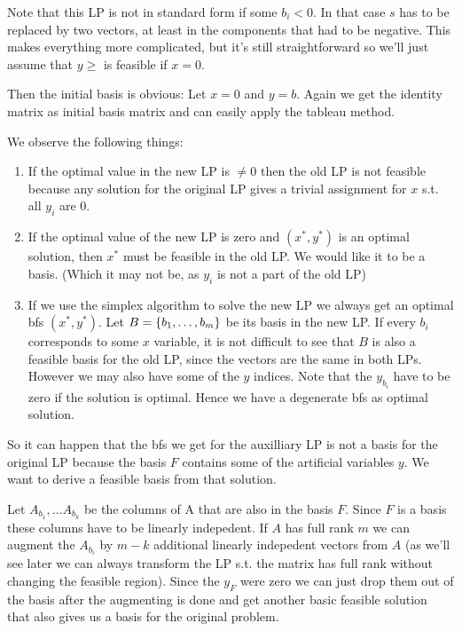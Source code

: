 Note that this LP is not in standard form if some $b_i<0$. In that case $s$ has to be replaced by two vectors, at least in the components that had to be negative. This makes everything more complicated, but it's still straightforward so we'll just assume that $y\geq$ is feasible if $x=0$.

Then the initial basis is obvious: Let $x=0$ and $y=b$. Again we get the identity matrix as initial basis matrix and can easily apply the tableau method.

We observe the following things:

\begin{enumerate}
\item If the optimal value in the new LP is $\neq 0$ then the old LP is not feasible because any solution for the original LP gives a trivial assignment for $x$ s.t. all $y_i$ are 0.
\item If the optimal value of the new LP is zero and $(x^*, y^*)$ is an optimal solution, then $x^*$ must be feasible in the old LP. We would like it to be a basis. (Which it may not be, as $y_i$ is not a part of the old LP)
\item If we use the simplex algorithm to solve the new LP we always get an optimal bfs $(x^*,y^*)$. Let $B=\{{b}_1,\ldots,{b}_{m}\}$ be its basis in the new LP. If every $b_i$ corresponds to some $x$ variable, it is not difficult to see that $B$ is also a feasible basis for the old LP, since the vectors are the same in both LPs. However we may also have some of the $y$ indices. Note that the $y_{b_i}$ have to be zero if the solution is optimal. Hence we have a degenerate bfs as optimal solution.
\end{enumerate}

So it can happen that the bfs we get for the auxilliary LP is not a basis for the original LP because the basis $F$ contains some of the artificial variables $y$. We want to derive a feasible basis from that solution.

Let $A_{b_1},\ldots A_{b_k}$ be the columns of A that are also in the basis $F$. Since $F$ is a basis these columns have to be linearly indepedent. If $A$ has full rank $m$ we can augment the $A_{b_i}$ by $m-k$ additional linearly indepedent vectors from $A$ (as we'll see later we can always transform the LP s.t. the matrix has full rank without changing the feasible region). Since the $y_F$ were zero we can just drop them out of the basis after the augmenting is done and get another basic feasible solution that also gives us a basis for the original problem.

